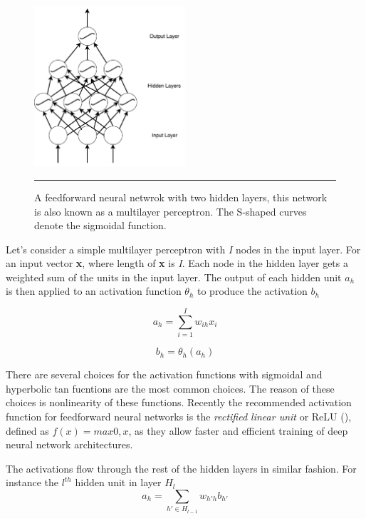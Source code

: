     \def\layersep{2.5cm}
    \begin{figure}
    \centering
    \includegraphics[width=0.5\textwidth,height=0.5\textheight,keepaspectratio]
        {Figures/mlp.pdf}
        \rule{35em}{0.5pt}
    \caption[Multilayer perceptron]
    {A feedforward neural netwrok with two hidden layers, this network is also known as a
    multilayer perceptron. The S-shaped curves denote the sigmoidal function.}
    \label{fig:ffnnetwork}
    \end{figure}

Let's consider a simple multilayer perceptron with \textit{I} nodes in the input layer. For an
input vector \textbf{x}, where length of \textbf{x} is \textit{I}. Each node in
the hidden layer gets a weighted sum of the units in the input layer. The output of each hidden unit
$a_{h}$ is then applied to an activation function $\theta_{h}$ to produce the activation $b_{h}$

    \begin{equation}
        a_{h} = \displaystyle\sum_{i=1}^\textit{I} w_{ih}x_{i}
    \end{equation}

    \begin{equation}
        b_{h} = \theta_{h}(a_{h})
    \end{equation}

There are several choices for the activation functions with sigmoidal and hyperbolic tan
fucntions are the most common choices. The reason of these choices is nonlinearity of
these functions. Recently the recommended activation function for feedforward neural networks is
the \emph{rectified linear unit} or ReLU (\citet{nair2010rectified}), defined as $f(x) = max{0,x}$,
as they allow faster and efficient training of deep neural network architectures.

The activations flow through the rest of the hidden layers in similar fashion. For instance the
$l^{th}$ hidden unit in layer $H_{l}$
    \begin{equation}
        a_{h} = \displaystyle\sum_{h' \in H_{l-1}} w_{h'h}b_{h'}
    \end{equation}

